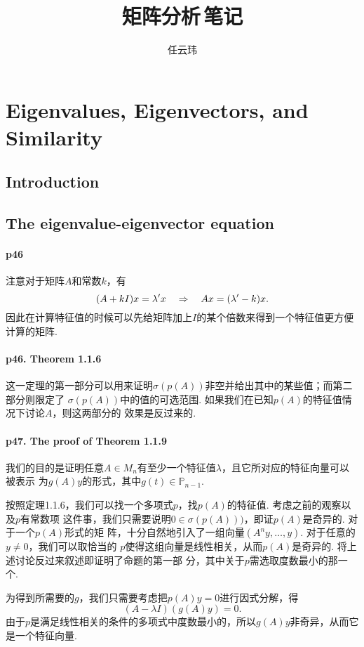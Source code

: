 

\title{矩阵分析$\,$笔记}
\author{任云玮}
\date{}


\maketitle
\tableofcontents

\newpage
\section{Eigenvalues, Eigenvectors, and Similarity}
\setcounter{subsection}{-1}
\subsection{Introduction}
\subsection{The eigenvalue-eigenvector equation}
  \paragraph{p46}
    注意对于矩阵$A$和常数$k$，有
    \[
      (A+kI)x=\lambda^\prime x \quad\Rightarrow\quad
      Ax = (\lambda^\prime-k)x.
    \]
    因此在计算特征值的时候可以先给矩阵加上$I$的某个倍数来得到一个特征值更方便计算的矩阵. 

  \paragraph{p46. Theorem 1.1.6}
    这一定理的第一部分可以用来证明$\sigma(p(A))$非空并给出其中的某些值；而第二部分则限定了
    $\sigma(p(A))$中的值的可选范围. 如果我们在已知$p(A)$的特征值情况下讨论$A$，则这两部分的
    效果是反过来的. 

  \paragraph{p47. The proof of Theorem 1.1.9}
    我们的目的是证明任意$A\in M_n$有至少一个特征值$\lambda$，且它所对应的特征向量可以被表示
    为$g(A)y$的形式，其中$g(t)\in\mathbb{P}_{n-1}$.\par
    按照定理1.1.6，我们可以找一个多项式$p$，找$p(A)$的特征值. 考虑之前的观察以及$p$有常数项
    这件事，我们只需要说明$0\in\sigma(p(A)))$，即证$p(A)$是奇异的. 对于一个$p(A)$形式的矩
    阵，十分自然地引入了一组向量$(A^ny, \dots, y)$. 对于任意的$y\ne 0$，我们可以取恰当的
    $p$使得这组向量是线性相关，从而$p(A)$是奇异的. 将上述讨论反过来叙述即证明了命题的第一部
    分，其中关于$p$需选取度数最小的那一个. \par
    为得到所需要的$g$，我们只需要考虑把$p(A)y=0$进行因式分解，得
    \[
      (A-\lambda I)(g(A)y) = 0.
    \]
    由于$p$是满足线性相关的条件的多项式中度数最小的，所以$g(A)y$非奇异，从而它是一个特征向量. 
